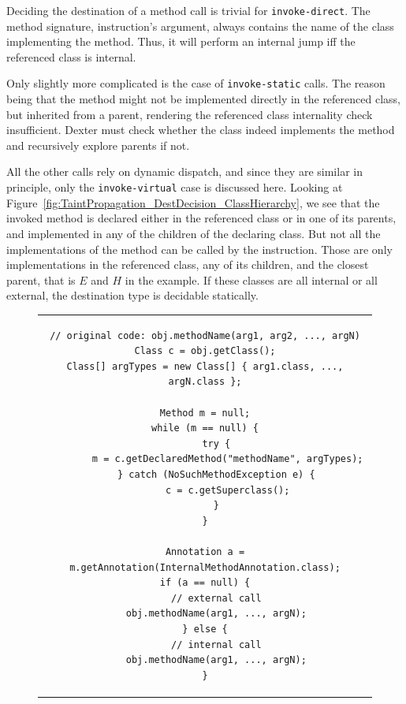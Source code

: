 \documentclass[12pt,twoside,notitlepage]{report}
\begin{document}
Deciding the destination of a method call is trivial for \verb$invoke-direct$. The method signature, instruction's argument, always contains the name of the class implementing the method. Thus, it will perform an internal jump iff the referenced class is internal.

Only slightly more complicated is the case of \verb$invoke-static$ calls. The reason being that the method might not be implemented directly in the referenced class, but inherited from a parent, rendering the referenced class internality check insufficient. Dexter must check whether the class indeed implements the method and recursively explore parents if not.

All the other calls rely on dynamic dispatch, and since they are similar in principle, only the \verb$invoke-virtual$ case is discussed here. Looking at Figure~\ref{fig:TaintPropagation_DestDecision_ClassHierarchy}, we see that the invoked method is declared either in the referenced class or in one of its parents, and implemented in any of the children of the declaring class. But not all the implementations of the method can be called by the instruction. Those are only implementations in the referenced class, any of its children, and the closest parent, that is $E$ and $H$ in the example. If these classes are all internal or all external, the destination type is decidable statically. 

\begin{figure}
	\centering
	\begin{tabular}{c}
	\begin{lstlisting}
// original code: obj.methodName(arg1, arg2, ..., argN)
Class c = obj.getClass();
Class[] argTypes = new Class[] { arg1.class, ..., argN.class };

Method m = null;
while (m == null) {
	try {
 		m = c.getDeclaredMethod("methodName", argTypes);
 	} catch (NoSuchMethodException e) {
 		c = c.getSuperclass();
 	}
}

Annotation a = m.getAnnotation(InternalMethodAnnotation.class);
if (a == null) {
	// external call
	obj.methodName(arg1, ..., argN);
} else {
	// internal call
	obj.methodName(arg1, ..., argN);
}
	\end{lstlisting}
	\end{tabular}
	\begin{lstlisting}[caption={Destination-deciding instrumentation for non-public methods},
	                   label={listing:TaintPropagation_MethodCall_DestDecidability_NonPublic}]
	\end{lstlisting}
\end{figure}
\end{document}
